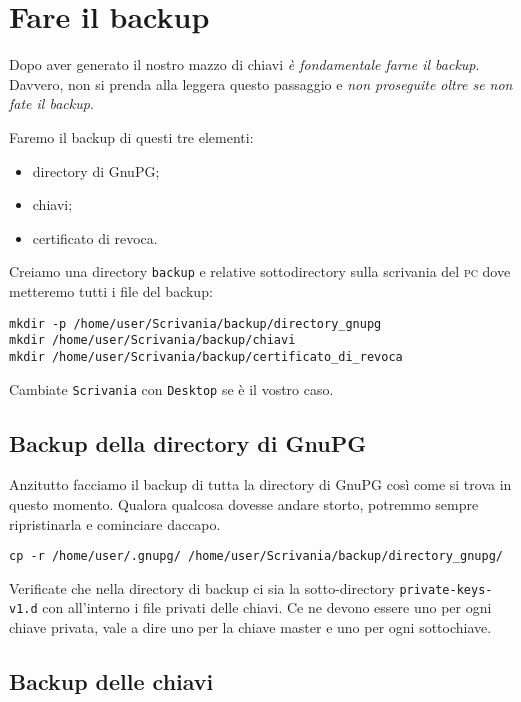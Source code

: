 \section{Fare il backup}

Dopo aver generato il nostro mazzo di chiavi \emph{è fondamentale farne il
backup}. Davvero, non si prenda alla leggera questo passaggio e \emph{non
proseguite oltre se non fate il backup}.

Faremo il backup di questi tre elementi:

\begin{itemize}
    \item directory di GnuPG;
    \item chiavi;
    \item certificato di revoca.
\end{itemize}

Creiamo una directory \texttt{backup} e relative sottodirectory sulla scrivania
del \textsc{pc} dove metteremo tutti i file del backup:

\begin{lstlisting}
mkdir -p /home/user/Scrivania/backup/directory_gnupg
mkdir /home/user/Scrivania/backup/chiavi
mkdir /home/user/Scrivania/backup/certificato_di_revoca
\end{lstlisting}


Cambiate \texttt{Scrivania} con \texttt{Desktop} se è il vostro caso.

\subsection{Backup della directory di GnuPG}
\label{backup-directory-gnupg}

Anzitutto facciamo il backup di tutta la directory di GnuPG così come si trova
in questo momento. Qualora qualcosa dovesse andare storto, potremmo sempre
ripristinarla e cominciare daccapo.

\begin{lstlisting}
cp -r /home/user/.gnupg/ /home/user/Scrivania/backup/directory_gnupg/
\end{lstlisting}

Verificate che nella directory di backup ci sia la sotto-directory\newline
\texttt{private-keys-v1.d} con all'interno i file privati delle chiavi. Ce ne
devono essere uno per ogni chiave privata, vale a dire uno per la chiave master
e uno per ogni sottochiave.

\subsection{Backup delle chiavi} \label{backup-chiavi}

